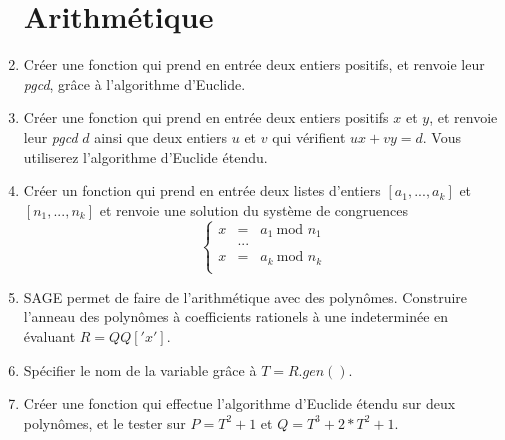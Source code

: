 \begin{enumerate}
\section{Arithmétique}
\item Créer une fonction qui prend en entrée deux entiers positifs, et renvoie leur \textit{pgcd}, grâce à l'algorithme d'Euclide.
\item Créer une fonction qui prend en entrée deux entiers positifs $x$ et $y$, et renvoie leur \textit{pgcd} $d$ ainsi que deux entiers $u$ et $v$ qui vérifient $ux+vy=d$. Vous utiliserez l'algorithme d'Euclide étendu.
\item Créer un fonction qui prend en entrée deux listes d'entiers $[a_1,...,a_k]$ et $[n_1,...,n_k]$ et renvoie une solution du système de congruences
\[\left\{\begin{array}{rcl}
 x & = & a_1 \ \text{mod }n_1\\
   &  ... & \\
 x & = & a_k \ \text{mod }n_k\\
\end{array}\right.\]
\item SAGE permet de faire de l'arithmétique avec des polynômes. Construire l'anneau des polynômes à coefficients rationels à une indeterminée en évaluant $R=QQ['x']$. 
\item Spécifier le nom de la variable grâce à $T=R.gen()$.
\item Créer une fonction qui effectue l'algorithme d'Euclide étendu sur deux polynômes, et le tester sur $P=T^2+1$ et $Q=T^3+2*T^2+1$.

\end{enumerate}
